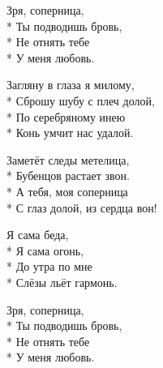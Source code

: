 \medskip

\begin{minipage}{\linewidth}
\hspace*{1.5em}Зря, соперница,\\*
\hspace*{1.5em}Ты подводишь бровь,\\*
\hspace*{1.5em}Не отнять тебе\\*
\hspace*{1.5em}У меня любовь.\\
\end{minipage}\par\medskip\nobreak

\medskip

\begin{minipage}{\linewidth}
Загляну в глаза я милому,\\*
Сброшу шубу с плеч долой,\\*
По серебряному инею\\*
Конь умчит нас удалой.\\
\end{minipage}\par\medskip\nobreak

\medskip

\begin{minipage}{\linewidth}
Заметёт следы метелица,\\*
Бубенцов растает звон.\\*
А тебя, моя соперница\\*
С глаз долой, из сердца вон!\\
\end{minipage}\par\medskip\nobreak

\medskip

\begin{minipage}{\linewidth}
\hspace*{1.5em}Я сама беда,\\*
\hspace*{1.5em}Я сама огонь,\\*
\hspace*{1.5em}До утра по мне\\*
\hspace*{1.5em}Слёзы льёт гармонь.\\
\end{minipage}\par\medskip\nobreak

\medskip

\begin{minipage}{\linewidth}
\hspace*{1.5em}Зря, соперница,\\*
\hspace*{1.5em}Ты подводишь бровь,\\*
\hspace*{1.5em}Не отнять тебе\\*
\hspace*{1.5em}У меня любовь.\\
\end{minipage}


